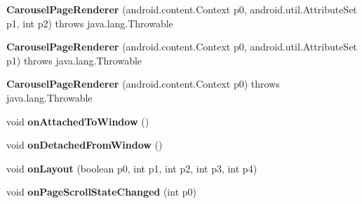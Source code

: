 \begin{DoxyCompactItemize}
\item 
\mbox{\label{classmd5270abb39e60627f0f200893b490a1ade_1_1_carousel_page_renderer_a6acde7f90db116b76b108b2bd1fb0b64}} 
{\bfseries Carousel\+Page\+Renderer} (android.\+content.\+Context p0, android.\+util.\+Attribute\+Set p1, int p2)  throws java.\+lang.\+Throwable 	
\item 
\mbox{\label{classmd5270abb39e60627f0f200893b490a1ade_1_1_carousel_page_renderer_af27701b1f80e7c9f9a2d586417747524}} 
{\bfseries Carousel\+Page\+Renderer} (android.\+content.\+Context p0, android.\+util.\+Attribute\+Set p1)  throws java.\+lang.\+Throwable 	
\item 
\mbox{\label{classmd5270abb39e60627f0f200893b490a1ade_1_1_carousel_page_renderer_aa9be454657ef82dbb21b8c50844607c8}} 
{\bfseries Carousel\+Page\+Renderer} (android.\+content.\+Context p0)  throws java.\+lang.\+Throwable 	
\item 
\mbox{\label{classmd5270abb39e60627f0f200893b490a1ade_1_1_carousel_page_renderer_abd56e6e003b938a7010f08820710a67f}} 
void {\bfseries on\+Attached\+To\+Window} ()
\item 
\mbox{\label{classmd5270abb39e60627f0f200893b490a1ade_1_1_carousel_page_renderer_a5f3c611e0c723d2ad1f8b55091798202}} 
void {\bfseries on\+Detached\+From\+Window} ()
\item 
\mbox{\label{classmd5270abb39e60627f0f200893b490a1ade_1_1_carousel_page_renderer_a078976cb18c541b71fc96248ccd767e6}} 
void {\bfseries on\+Layout} (boolean p0, int p1, int p2, int p3, int p4)
\item 
\mbox{\label{classmd5270abb39e60627f0f200893b490a1ade_1_1_carousel_page_renderer_a99b77538c0fbbfb488645c55e676c438}} 
void {\bfseries on\+Page\+Scroll\+State\+Changed} (int p0)

\end{DoxyCompactItemize}
